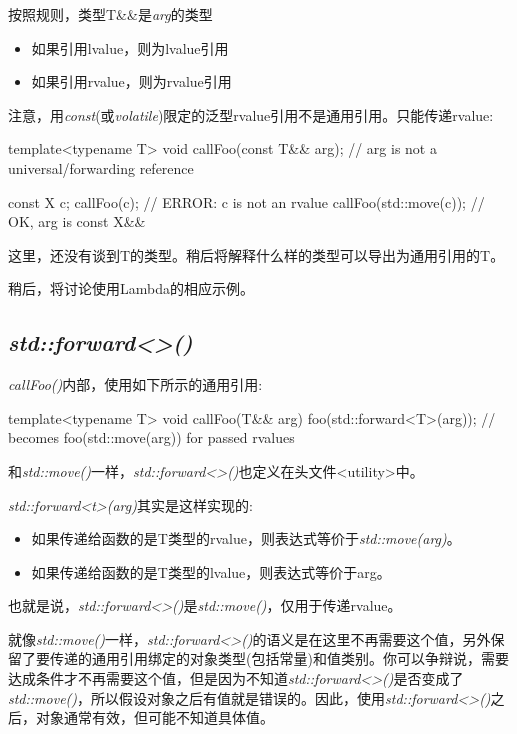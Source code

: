 按照规则，类型T\&\&是\textit{arg}的类型

\begin{itemize}
	\item 如果引用lvalue，则为lvalue引用
	\item 如果引用rvalue，则为rvalue引用
\end{itemize}

注意，用\textit{const}(或\textit{volatile})限定的泛型rvalue引用不是通用引用。只能传递rvalue:

\begin{cppcode}
template<typename T>
void callFoo(const T&& arg); // arg is not a universal/forwarding reference

const X c;
callFoo(c); // ERROR: c is not an rvalue
callFoo(std::move(c)); // OK, arg is const X&&
\end{cppcode}

这里，还没有谈到T的类型。稍后将解释什么样的类型可以导出为通用引用的T。

稍后，将讨论使用Lambda的相应示例。

\subsection{\textit{std::forward<>()}}

\textit{callFoo()}内部，使用如下所示的通用引用:

\begin{cppcode}
template<typename T>
void callFoo(T&& arg) {
	foo(std::forward<T>(arg)); // becomes foo(std::move(arg)) for passed rvalues
}
\end{cppcode}

和\textit{std::move()}一样，\textit{std::forward<>()}也定义在头文件<utility>中。

\textit{std::forward<t>(arg)}其实是这样实现的:

\begin{itemize}
	\item 如果传递给函数的是T类型的rvalue，则表达式等价于\textit{std::move(arg)}。
	\item 如果传递给函数的是T类型的lvalue，则表达式等价于arg。
\end{itemize}

也就是说，\textit{std::forward<>()}是\textit{std::move()}，仅用于传递rvalue。

就像\textit{std::move()}一样，\textit{std::forward<>()}的语义是在这里不再需要这个值，另外保留了要传递的通用引用绑定的对象类型(包括常量)和值类别。你可以争辩说，需要达成条件才不再需要这个值，但是因为不知道\textit{std::forward<>()}是否变成了\textit{std::move()}，所以假设对象之后有值就是错误的。因此，使用\textit{std::forward<>()}之后，对象通常有效，但可能不知道具体值。

